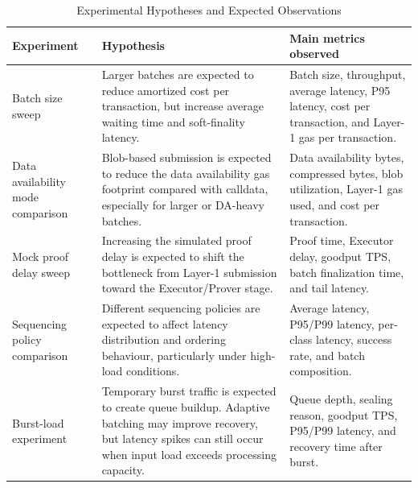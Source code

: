 \begin{table}[!htbp]
\centering
\caption{Experimental Hypotheses and Expected Observations}
\label{tab:experimental_hypotheses}
\compacttable
\begin{tabularx}{\textwidth}{@{}p{}Y Y@{}}
\toprule
\textbf{Experiment} & \textbf{Hypothesis} & \textbf{Main metrics observed} \\
\midrule

Batch size sweep
& Larger batches are expected to reduce amortized cost per transaction, but increase average waiting time and soft-finality latency.
& Batch size, throughput, average latency, P95 latency, cost per transaction, and Layer-1 gas per transaction. \\

\addlinespace

Data availability mode comparison
& Blob-based submission is expected to reduce the data availability gas footprint compared with calldata, especially for larger or DA-heavy batches.
& Data availability bytes, compressed bytes, blob utilization, Layer-1 gas used, and cost per transaction. \\

\addlinespace

Mock proof delay sweep
& Increasing the simulated proof delay is expected to shift the bottleneck from Layer-1 submission toward the Executor/Prover stage.
& Proof time, Executor delay, goodput TPS, batch finalization time, and tail latency. \\

\addlinespace

Sequencing policy comparison
& Different sequencing policies are expected to affect latency distribution and ordering behaviour, particularly under high-load conditions.
& Average latency, P95/P99 latency, per-class latency, success rate, and batch composition. \\

\addlinespace

Burst-load experiment
& Temporary burst traffic is expected to create queue buildup. Adaptive batching may improve recovery, but latency spikes can still occur when input load exceeds processing capacity.
& Queue depth, sealing reason, goodput TPS, P95/P99 latency, and recovery time after burst. \\

\bottomrule
\end{tabularx}
\end{table}
\normalsize

